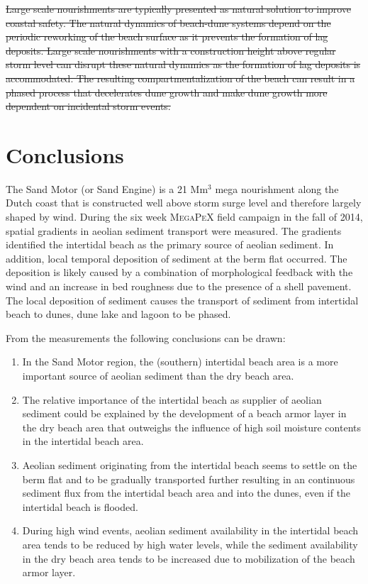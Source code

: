 \documentclass[preprint,12pt,authoryear,a4paper]{elsarticle}
\providecommand{\DIFdel}[1]{{\protect\color{red}\sout{#1}}}                      %
\providecommand{\DIFdelend}{} %
\begin{document}
\DIFdel{Large scale nourishments are typically presented as natural solution
to improve coastal safety. The natural dynamics of beach-dune systems
depend on the periodic reworking of the beach surface as it prevents
the formation of lag deposits. Large scale nourishments with a
construction height above regular storm level can disrupt these
natural dynamics as the formation of lag deposits is accommodated. The
resulting compartmentalization of the beach can result in a phased
process that decelerates dune growth and make dune growth more
dependent on incidental storm events.
}%

\DIFdelend \section{Conclusions}

The Sand Motor (or Sand Engine) is a 21 $\mathrm{Mm^3}$ mega
nourishment along the Dutch coast that is constructed well above storm
surge level \citep{Stive2013} and therefore largely shaped by
wind. During the six week \textsc{MegaPeX} field campaign in the fall
of 2014, spatial gradients in aeolian sediment transport were
measured. The gradients identified the intertidal beach as the primary
source of aeolian sediment. In addition, local temporal deposition of
sediment at the berm flat occurred. The deposition is likely caused by
a combination of morphological feedback with the wind and an increase
in bed roughness due to the presence of a shell pavement. The local
deposition of sediment causes the transport of sediment from
intertidal beach to dunes, dune lake and lagoon to be phased.

\bigskip

\noindent From the measurements the following conclusions can be drawn:

\begin{enumerate}
\item In the Sand Motor region, the (southern) intertidal beach area
  is a more important source of aeolian sediment than the dry beach
  area.
\item The relative importance of the intertidal beach as supplier of
  aeolian sediment could be explained by the development of a beach
  armor layer in the dry beach area that outweighs the influence of
  high soil moisture contents in the intertidal beach area.
\item Aeolian sediment originating from the intertidal beach seems to
  settle on the berm flat and to be gradually transported further
  resulting in an continuous sediment flux from the intertidal beach
  area and into the dunes, even if the intertidal beach is flooded.
\item During high wind events, aeolian sediment availability in the
  intertidal beach area tends to be reduced by high water levels,
  while the sediment availability in the dry beach area tends to be
  increased due to mobilization of the beach armor layer.
\end{enumerate}
\end{document}
